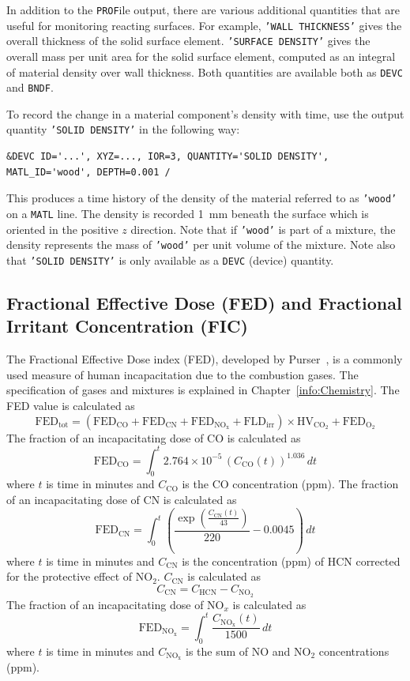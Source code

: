 \documentclass[11pt]{book}
\newcommand{\ct}{\tt\small}
\newcommand{\be}{\begin{equation}}
\newcommand{\ee}{\end{equation}}
\begin{document}
In addition to the {\ct PROF}ile output, there are various additional quantities that are useful for monitoring reacting
surfaces. For example, {\ct 'WALL THICKNESS'} gives the overall thickness of the solid surface
element. {\ct 'SURFACE DENSITY'} gives the overall mass per unit area for the
solid surface element, computed as an integral of material density over wall
thickness. Both quantities are available both as {\ct DEVC} and {\ct BNDF}.

To record the change in a material
component's density with time, use the output quantity {\ct 'SOLID DENSITY'} in the following way:

\footnotesize
\begin{verbatim}
&DEVC ID='...', XYZ=..., IOR=3, QUANTITY='SOLID DENSITY', MATL_ID='wood', DEPTH=0.001 /
\end{verbatim} \normalsize

\noindent
This produces a time history of the density of the material referred to as {\ct 'wood'} on a {\ct MATL} line. The density
is recorded 1~mm beneath the surface which is oriented in the positive $z$ direction. Note that if {\ct 'wood'} is part of a mixture, the
density represents the mass of {\ct 'wood'} per unit volume of the mixture. Note also that {\ct 'SOLID DENSITY'} is only available as a
{\ct DEVC} (device) quantity.

\subsection{Fractional Effective Dose (FED) and Fractional Irritant Concentration (FIC)}
\label{info:FED}

The Fractional Effective Dose index (FED), developed by Purser~\cite{SFPE:Purser}, is a commonly used measure of human incapacitation
due to the combustion gases. The specification of gases and mixtures is explained in Chapter~\ref{info:Chemistry}. The FED value is calculated as
\be
\mathrm{FED}_\mathrm{tot} = (\mathrm{FED}_\mathrm{CO} + \mathrm{FED}_\mathrm{CN} + \mathrm{FED}_\mathrm{NO_x} + \mathrm{FLD}_\mathrm{irr}) \times \mathrm{HV}_\mathrm{CO_2} + \mathrm{FED}_\mathrm{O_2}
\ee
The fraction of an incapacitating dose of CO is calculated as
\be
\mathrm{FED}_\mathrm{CO} = \int_0^t 2.764 \times 10^{-5} \, (C_\mathrm{CO}(t))^{1.036} \, dt
\ee
where $t$ is time in minutes and $C_\mathrm{CO}$ is the CO concentration (ppm). The fraction of an incapacitating dose of CN is calculated as
\be
\mathrm{FED}_\mathrm{CN} = \int_0^t \left( \frac{\exp\left( \frac{C_\mathrm{CN}(t)}{43} \right)}{220} - 0.0045 \right) \, dt
\ee
where $t$ is time in minutes and $C_\mathrm{CN}$ is the concentration (ppm) of HCN corrected for the protective effect of NO$_\mathrm{2}$. $C_\mathrm{CN}$ is calculated as
\be
C_\mathrm{CN} = C_\mathrm{HCN} - C_\mathrm{NO_2}
\ee
The fraction of an incapacitating dose of NO$_x$ is calculated as
\be
\mathrm{FED}_\mathrm{NO_x} = \int_0^t \frac{C_\mathrm{NO_x}(t)}{1500} \, dt
\ee
where $t$ is time in minutes and $C_\mathrm{NO_x}$ is the sum of NO and NO$_\mathrm{2}$ concentrations (ppm).
\end{document}

